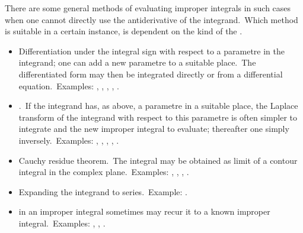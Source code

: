 \documentclass[12pt]{article}
\theoremstyle{definition}
\begin{document}

There are some general methods of evaluating improper integrals in such cases when one cannot directly use the antiderivative of the integrand.\, Which method is suitable in a certain instance, is dependent on the kind of the .\\

\begin{itemize}
\item Differentiation under the integral sign with respect to a 
parametre in the integrand; one can add a new parametre to a 
suitable place.\, The differentiated form may then be 
integrated directly or from a differential equation.\, Examples: 
, 
, 
, 
, 
.
\item {}.\, If the 
integrand has, as above, a parametre in a suitable place, the 
Laplace transform of the integrand with respect to this 
parametre is often simpler to integrate and the new improper 
integral to evaluate; thereafter one simply 
 inversely.\, Examples: 
, 
, 
, 
, 
.
\item Cauchy residue theorem.\, The integral may be obtained as 
limit of a contour integral in the complex plane.\, Examples: 
, 
, 
, 
.
\item Expanding the integrand to series.\, Example: 
.
\item 
{} in an improper integral sometimes may recur it to a known improper integral.\, Examples: 
, 
,
.
\end{itemize}







\end{document}
